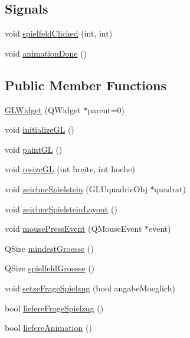 \subsection*{Signals}
\begin{DoxyCompactItemize}
\item 
void \hyperlink{classGLWidget_ab39fa82a1c9ebaf72705013d16b82ead}{spielfeld\-Clicked} (int, int)
\item 
void \hyperlink{classGLWidget_a364029cdf5543ec0a89ebc75033c94cf}{animation\-Done} ()
\end{DoxyCompactItemize}
\subsection*{Public Member Functions}
\begin{DoxyCompactItemize}
\item 
\hyperlink{classGLWidget_ab79c391c86de1ffb76f6950b49d82c0c}{G\-L\-Widget} (Q\-Widget $\ast$parent=0)
\item 
void \hyperlink{classGLWidget_a7fab13e8cc9fc0730ca54c08b2c923a7}{initialize\-G\-L} ()
\item 
void \hyperlink{classGLWidget_a640b5570cb2b37724fd5b58a77339c5e}{paint\-G\-L} ()
\item 
void \hyperlink{classGLWidget_a81d96c3a1f7b81ba1f8cd84e590d9bdc}{resize\-G\-L} (int breite, int hoehe)
\item 
void \hyperlink{classGLWidget_abe84c820e63e0471060ae8a52d22d48d}{zeichne\-Spielstein} (G\-L\-Uquadric\-Obj $\ast$quadrat)
\item 
void \hyperlink{classGLWidget_a6ce32f69bd43407acad1fcf6e24bad09}{zeichne\-Spielstein\-Layout} ()
\item 
void \hyperlink{classGLWidget_ab144cc8064c1bbf6d0ef0646ca0bd06c}{mouse\-Press\-Event} (Q\-Mouse\-Event $\ast$event)
\item 
Q\-Size \hyperlink{classGLWidget_afa31f139572999beb2e0d3de0c163059}{mindest\-Groesse} ()
\item 
Q\-Size \hyperlink{classGLWidget_ac19f12d5851509a8102251825c61e1c6}{spielfeld\-Groesse} ()
\item 
void \hyperlink{classGLWidget_a202b2be8dd40de28fd78f0d66a1a9b7d}{setze\-Frage\-Spielzug} (bool angabe\-Moeglich)
\item 
bool \hyperlink{classGLWidget_ad9250100246069a68437b5642ae5599f}{liefere\-Frage\-Spielzug} ()
\item 
bool \hyperlink{classGLWidget_a888efdb7d698d6603887846729eeee35}{liefere\-Animation} ()
\item 

\end{DoxyCompactItemize}

